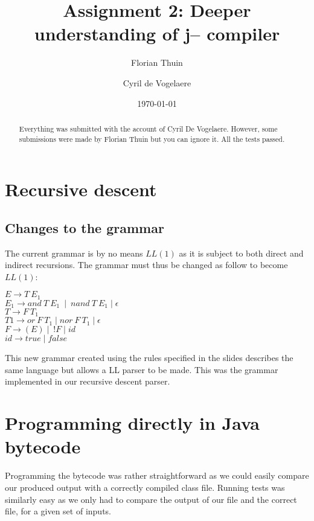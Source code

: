 \documentclass[a4paper, 11pt]{article}
\author{Florian Thuin \and Cyril de Vogelaere}
\date{\today}
\title{Assignment 2: Deeper understanding of j-- compiler}
\begin{document}
    \maketitle

    \begin{abstract}
        Everything was submitted with the account of Cyril De Vogelaere.
        However, some submissions were made by Florian Thuin but you can
        ignore it. All the tests passed.
    \end{abstract}

    \section{Recursive descent}
    \subsection{Changes to the grammar}

    	The current grammar is by no means $LL(1)$ as it is subject to both direct and
    	indirect recursions. The grammar must thus be changed as follow to become $LL(1)$:
    	\newline

    	\begin{flushleft}
    	$E \rightarrow T\ E_1$ \\
    	$E_1 \rightarrow and\ T\ E_1\ \mid\ nand\ T\ E_1 \mid \epsilon$ \\
    	$T \rightarrow F\ T_1$ \\
		$T1 \rightarrow or\ F\ T_1 \mid nor\ F\ T_1 \mid \epsilon$ \\
		$F \rightarrow ( E ) \mid\ !F \mid id$ \\
		$id \rightarrow true \mid false$ \\
		\end{flushleft}

    	This new grammar created using the rules specified in the slides describes
    	the same language but allows a LL parser to be made. This was the grammar
    	implemented in our recursive descent parser.

    \section{Programming directly in Java bytecode}

    	Programming the bytecode was rather straightforward as we could easily compare
    	our produced output with a correctly compiled class file. Running tests was similarly
    	easy as we only had to compare the output of our file and the correct file, for a
    	given set of inputs.
\end{document}
